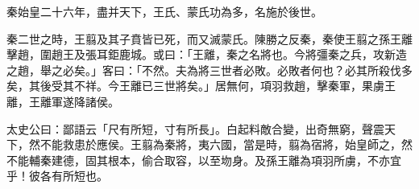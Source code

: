 \begin{pinyinscope}
秦始皇二十六年，盡并天下，王氏、蒙氏功為多，名施於後世。

秦二世之時，王翦及其子賁皆已死，而又滅蒙氏。陳勝之反秦，秦使王翦之孫王離擊趙，圍趙王及張耳鉅鹿城。或曰：「王離，秦之名將也。今將彊秦之兵，攻新造之趙，舉之必矣。」客曰：「不然。夫為將三世者必敗。必敗者何也？必其所殺伐多矣，其後受其不祥。今王離已三世將矣。」居無何，項羽救趙，擊秦軍，果虜王離，王離軍遂降諸侯。

太史公曰：鄙語云「尺有所短，寸有所長」。白起料敵合變，出奇無窮，聲震天下，然不能救患於應侯。王翦為秦將，夷六國，當是時，翦為宿將，始皇師之，然不能輔秦建德，固其根本，偷合取容，以至圽身。及孫王離為項羽所虜，不亦宜乎！彼各有所短也。


\end{pinyinscope}